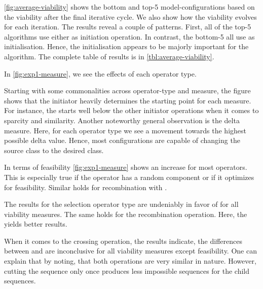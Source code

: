 \documentclass[./../../paper.tex]{subfiles}
\begin{document}
\autoref{fig:average-viability} shows the bottom and top-5 model-configurations based on the viability after the final iterative cycle. We also show how the viability evolves for each iteration. The results reveal a couple of patterns. 
First, all of the top-5 algorithms use either  as initiation operation. In contrast, the bottom-5 all use  as initialisation. Hence, the initialisation appears to be majorly important for the algorithm.
The complete table of results is in \autoref{tbl:average-viability}.





In \autoref{fig:exp1-measure}, we see the effects of each operator type. 

Starting with some commonalities across operator-type and measure, the figure shows that the initiator heavily determines the starting point for each measure. For instance, the  starts well below the other initiator operations when it comes to sparcity and similarity. 
Another noteworthy general observation is the delta measure. Here, for each operator type we see a movement towards the highest possible delta value. Hence, most configurations are capable of changing the source class to the desired class. 

In terms of feasibility \autoref{fig:exp1-measure} shows an increase for most operators. This is especially true if the operator has a random component or if it optimizes for feasibility. Similar holds for recombination with .

The results for the selection operator type are undeniably in favor of  for all viability measures. The same holds for the recombination operation. Here, the  yields better results.

When it comes to the crossing operation, the results indicate, the differences between  and  are inconclusive for all viability measures except feasibility. One can explain that by noting, that both operations are very similar in nature. However, cutting the sequence only once produces less impossible sequences for the child sequences.
\end{document}
